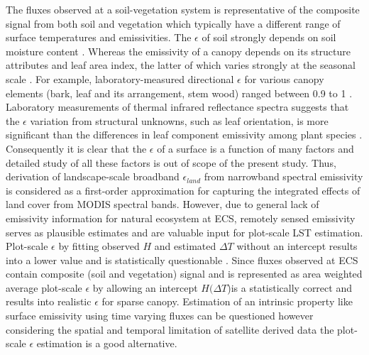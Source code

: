 \documentclass[fleqn,10pt]{wlscirep}
\begin{document}
{The fluxes observed at  a soil-vegetation system is representative of the composite signal from both soil and vegetation which typically have a different range of surface temperatures and emissivities\cite{jin_improved_2006-1}. The $\epsilon$ of soil strongly depends on soil moisture content \cite{mira2007influence}. Whereas the emissivity of a canopy depends on its structure attributes and leaf area index, the latter of which varies strongly at the seasonal scale \cite{chen2015determining}. For example, laboratory-measured directional $\epsilon$ for various canopy elements (bark, leaf and its arrangement, stem wood) ranged between 0.9 to 1 \cite{vishnevetsky2019method}. %
Laboratory measurements of thermal infrared  reflectance spectra suggests that the $\epsilon$ variation from structural unknowns, such as leaf orientation, is more significant than the differences in leaf component emissivity among plant species \cite{snyder1998classification}. Consequently it is clear that the $\epsilon$ of a surface is a function of many factors and detailed study of all these factors is out of scope of the present study. Thus, derivation of landscape-scale broadband $\epsilon_{land}$ from narrowband spectral emissivity is considered as a first-order approximation for capturing the integrated effects of land cover from MODIS spectral bands\cite{jin_improved_2006-1}. However, due to general lack of emissivity information for natural ecosystem at ECS, remotely sensed emissivity serves as  plausible estimates and are valuable input for plot-scale LST estimation. Plot-scale $\epsilon$ by fitting observed $H$ and estimated $\Delta T$ without an intercept results into a lower value and is statistically questionable \cite{eisenhauer2003regression}. Since fluxes observed at ECS contain composite (soil and vegetation) signal and  is represented as area weighted average plot-scale $\epsilon$ by allowing an intercept $H(\Delta T$)is a statistically correct and results into realistic $\epsilon$ for sparse canopy. Estimation of an intrinsic property like surface emissivity using time varying fluxes can be questioned however considering the spatial and temporal limitation of satellite derived data the plot-scale $\epsilon$ estimation is a good alternative.

}
\end{document}
